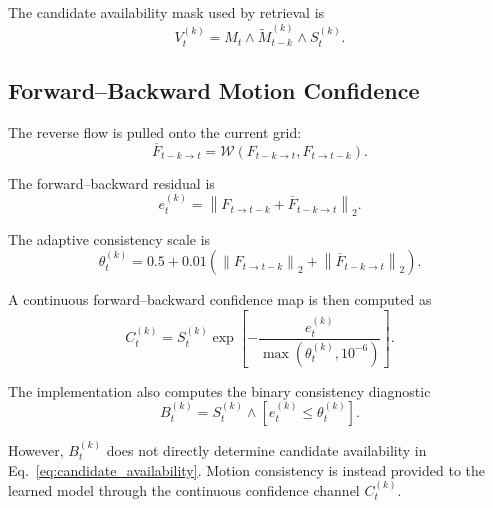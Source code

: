 \documentclass[11pt,a4paper]{article}
\providecommand{\warp}{\mathcal{W}}
\begin{document}
The candidate availability mask used by retrieval is
%
\begin{equation}
V_t^{(k)}
=
M_t
\land
\widetilde M_{t-k}^{(k)}
\land
S_t^{(k)}.
\label{eq:candidate_availability}
\end{equation}

\subsection{Forward--Backward Motion Confidence}
\label{sec:fb_confidence}

The reverse flow is pulled onto the current grid:
%
\begin{equation}
\overline F_{t-k\rightarrow t}
=
\warp
\left(
F_{t-k\rightarrow t},
F_{t\rightarrow t-k}
\right).
\label{eq:aligned_reverse_flow}
\end{equation}

The forward--backward residual is
%
\begin{equation}
e_t^{(k)}
=
\left\|
F_{t\rightarrow t-k}
+
\overline F_{t-k\rightarrow t}
\right\|_2.
\label{eq:fb_residual}
\end{equation}

The adaptive consistency scale is
%
\begin{equation}
\theta_t^{(k)}
=
0.5
+
0.01
\left(
\left\|
F_{t\rightarrow t-k}
\right\|_2
+
\left\|
\overline F_{t-k\rightarrow t}
\right\|_2
\right).
\label{eq:fb_threshold}
\end{equation}

A continuous forward--backward confidence map is then computed as
%
\begin{equation}
C_t^{(k)}
=
S_t^{(k)}
\exp
\left[
-\frac{
e_t^{(k)}
}{
\max\left(\theta_t^{(k)},10^{-6}\right)
}
\right].
\label{eq:fb_confidence}
\end{equation}

The implementation also computes the binary consistency diagnostic
%
\begin{equation}
B_t^{(k)}
=
S_t^{(k)}
\land
\left[
e_t^{(k)}
\leq
\theta_t^{(k)}
\right].
\label{eq:binary_fb_consistency}
\end{equation}

However, \(B_t^{(k)}\) does not directly determine candidate
availability in Eq.~\eqref{eq:candidate_availability}. Motion
consistency is instead provided to the learned model through the
continuous confidence channel \(C_t^{(k)}\).

\end{document}
